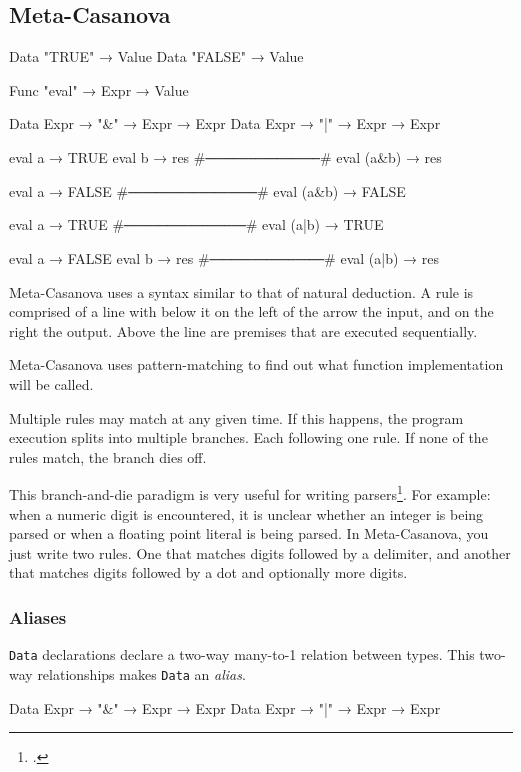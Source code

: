 \subsection{Meta-Casanova}
  \begin{code}[caption=A Boolean expression interpreter in Meta-Casanova.]
  Data "TRUE"  → Value
  Data "FALSE" → Value
  
  Func "eval" → Expr → Value
  
  Data Expr → "&" → Expr → Expr
  Data Expr → "|" → Expr → Expr
  
  
  eval a → TRUE
  eval b → res
  #\verb|────────────────|#
  eval (a&b) → res
  
  
  eval a → FALSE
  #\verb|──────────────────|#
  eval (a&b) → FALSE
  
  
  eval a → TRUE
  #\verb|─────────────────|#
  eval (a|b) → TRUE
  
  
  eval a → FALSE
  eval b → res
  #\verb|────────────────|#
  eval (a|b) → res
  \end{code}

  Meta-Casanova uses a syntax similar to that of natural deduction.
  A rule is comprised of a line with below it on the left of the arrow the input, and on the right the output.
  Above the line are premises that are executed sequentially.

  Meta-Casanova uses pattern-matching to find out what function implementation will be called.

  Multiple rules may match at any given time.
  If this happens, the program execution splits into multiple branches.
  Each following one rule.
  If none of the rules match, the branch dies off. 
  
  This branch-and-die paradigm is very useful for writing parsers\footcite{TODO:source}.
  For example: when a numeric digit is encountered,
  it is unclear whether an integer is being parsed or when a floating point literal is being parsed. 
  In Meta-Casanova, you just write two rules.
  One that matches digits followed by a delimiter,
  and another that matches digits followed by a dot and optionally more digits.

  \subsubsection*{Aliases}
  \texttt{Data} declarations declare a two-way \mbox{many-to-1} relation between types.
  This two-way relationships makes \texttt{Data} an \textit{alias}.

  \begin{code}
  Data Expr → "&" → Expr → Expr
  Data Expr → "|" → Expr → Expr
  \end{code}

